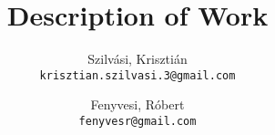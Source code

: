 \documentclass[11 pt,a4paper,english]{article}
\title{Description of Work}
\author{
	Szilvási, Krisztián\\
	\texttt{krisztian.szilvasi.3@gmail.com}
	\and
	Fenyvesi, Róbert\\
	\texttt{fenyvesr@gmail.com}
}
\begin{document}
\maketitle

\newpage



\tableofcontents

\newpage



\newpage



\printglossaries

\section{}
\end{document}
